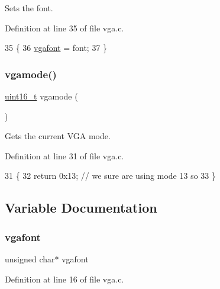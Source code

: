 Sets the font. 



Definition at line 35 of file vga.\+c.


\begin{DoxyCode}
35                                   \{
36     \hyperlink{a00032_a586c0ac088deb9338d9b1464dcd587c8_a586c0ac088deb9338d9b1464dcd587c8}{vgafont} = font;
37 \}
\end{DoxyCode}
\mbox{\label{a00032_af6d170c9401ea8f94d4c5cf09347cca7_af6d170c9401ea8f94d4c5cf09347cca7}} 
\subsubsection{\texorpdfstring{vgamode()}{vgamode()}}
{\footnotesize\ttfamily \hyperlink{a00101_a273cf69d639a59973b6019625df33e30_a273cf69d639a59973b6019625df33e30}{uint16\+\_\+t} vgamode (\begin{DoxyParamCaption}{ }\end{DoxyParamCaption})}



Gets the current V\+GA mode. 



Definition at line 31 of file vga.\+c.


\begin{DoxyCode}
31                    \{
32     \textcolor{keywordflow}{return} 0x13; \textcolor{comment}{// we sure are using mode 13 so}
33 \}
\end{DoxyCode}


\subsection{Variable Documentation}
\mbox{\label{a00032_a586c0ac088deb9338d9b1464dcd587c8_a586c0ac088deb9338d9b1464dcd587c8}} 
\subsubsection{\texorpdfstring{vgafont}{vgafont}}
{\footnotesize\ttfamily unsigned char$\ast$ vgafont}



Definition at line 16 of file vga.\+c.

